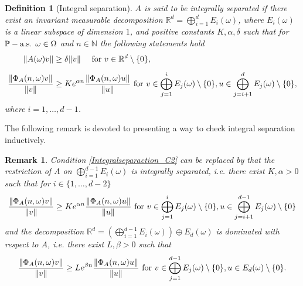 \documentclass[pdflatex,sn-mathphys-num]{sn-jnl}%
\theoremstyle{thmstyleone}%
\theoremstyle{thmstyletwo}%
\newtheorem{remark}{Remark}
\theoremstyle{thmstylethree}%
\newtheorem{definition}{Definition}%
\newcommand{\N}{\mathbb{N}}
\newcommand{\R}{\mathbb{R}}
\newcommand{\mP}{\mathbb{P}}
\numberwithin{equation}{section}
\begin{document}
\begin{definition}[Integral separation]
 $A$ is said to be \emph{integrally separated} if there exist  an invariant measurable decomposition $\R^d=\bigoplus_{i=1}^d E_i(\omega)$, where $E_i(\omega)$ is a linear subspace of dimension $1$, and positive constants $K,\alpha,\delta$ such that for $\mP- \hbox{a.s. } \omega\in\Omega$ and $n\in\N$ the following statements hold
 \begin{align}
\|A(\omega)v\|
& \geq \delta\|v\|\quad \hbox{ for } v\in \R^d\setminus\{0\},
\label{Integralseparaction_C1}\\[1ex]     
\frac{\|\Phi_A(n,\omega)v\|}{\|v\|}
& \geq
K e^{\alpha n}
 \frac{\|\Phi_A(n,\omega)u\|}{\|u\|}\hbox{ for }  v\in \bigoplus_{j=1}^i E_j(\omega)\setminus\{0\}, u\in \bigoplus_{j=i+1}^dE_{j}(\omega)\setminus\{0\},
 \label{Integralseparaction_C2}
 \end{align}
where $i=1,\dots,d-1$.
\end{definition}
%
The following remark is devoted to presenting a way to check integral separation inductively. 
%
\begin{remark}\label{Checkingintegralseparation}
Condition \eqref{Integralseparaction_C2} can be replaced by that the restriction of $A$ on $\bigoplus_{i=1}^{d-1} E_i(\omega)$ is integrally separated, i.e. there exist $K,\alpha>0$ such that for $i\in\{1,\dots,d-2\}$
\begin{equation}\label{IntegralSeparation_Equivalence1}
\frac{\|\Phi_A(n,\omega)v\|}{\|v\|}
 \geq
K e^{\alpha n}
 \frac{\|\Phi_A(n,\omega)u\|}{\|u\|}\hbox{ for }  v\in \bigoplus_{j=1}^i E_j(\omega)\setminus\{0\}, u\in \bigoplus_{j=i+1}^{d-1}E_{j}(\omega)\setminus\{0\}    
\end{equation}
and the decomposition $\R^d= \left(\bigoplus_{i=1}^{d-1} E_i(\omega)\right)\oplus E_d(\omega)$ is dominated with respect to $A$, i.e. there exist $L,\beta>0$ such that 
\begin{equation}\label{IntegralSeparation_Equivalence2}
\frac{\|\Phi_A(n,\omega)v\|}{\|v\|}
 \geq
L e^{\beta n}
 \frac{\|\Phi_A(n,\omega)u\|}{\|u\|}\hbox{ for }  v\in \bigoplus_{j=1}^{d-1} E_j(\omega)\setminus\{0\}, u\in E_{d}(\omega)\setminus\{0\}.    
\end{equation}
\end{remark}
%
\end{document}
